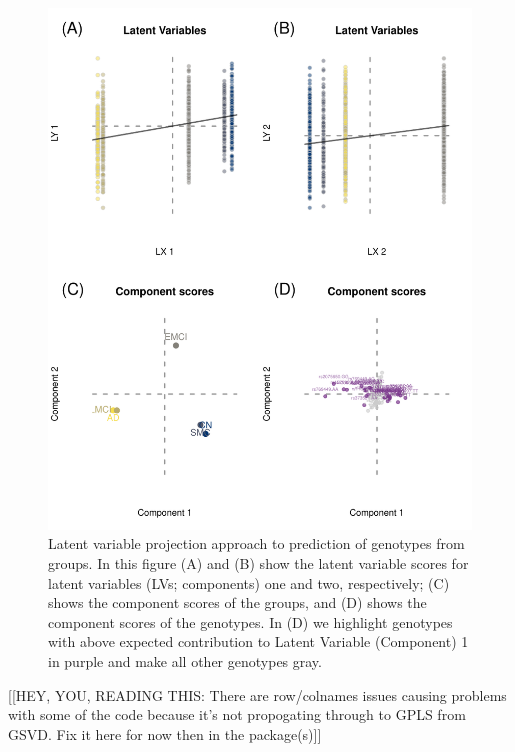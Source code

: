 \documentclass[12pt]{article}
\begin{document}
\begin{figure}[!hbtp]

{\centering \includegraphics[width=.8\textwidth,height=.8\textheight]{PLSCAR_to_a_GPLS_files/figure-latex/unnamed-chunk-5-1} 

}

\caption{\label{fig:contributions_ex1} Latent variable projection approach to prediction of genotypes from groups. In this figure (A) and (B) show the latent variable scores for latent variables (LVs; components) one and two, respectively; (C) shows the component scores of the groups, and (D) shows the component scores of the genotypes. In (D) we highlight genotypes with above expected contribution to Latent Variable (Component) 1 in purple and make all other genotypes gray.}\label{fig:unnamed-chunk-5}
\end{figure}

{[}{[}HEY, YOU, READING THIS: There are row/colnames issues causing
problems with some of the code because it's not propogating through to
GPLS from GSVD. Fix it here for now then in the package(s){]}{]}
\end{document}
